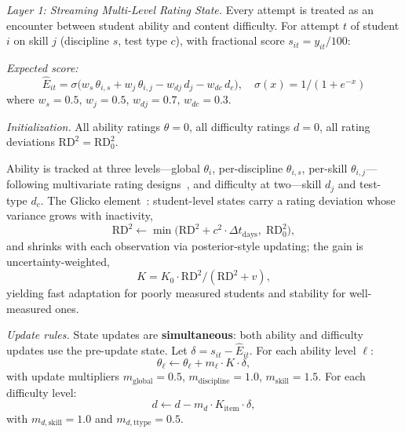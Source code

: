 \documentclass[11pt]{article}
\begin{document}
\textit{Layer 1: Streaming Multi-Level Rating State.}\quad
Every attempt is treated as an encounter between student ability and content difficulty.
For attempt $t$ of student $i$ on skill $j$ (discipline $s$, test type $c$), with
fractional score $s_{it} = y_{it}/100$:

\medskip\noindent
\textit{Expected score:}
\begin{equation}
\hat{E}_{it} = \sigma\bigl(w_s\,\theta_{i,s} + w_j\,\theta_{i,j} - w_{dj}\,d_j - w_{dc}\,d_c\bigr),
\quad \sigma(x) = 1/(1+e^{-x})
\label{eq:expected}
\end{equation}
where $w_s = 0.5$, $w_j = 0.5$, $w_{dj} = 0.7$, $w_{dc} = 0.3$.

\medskip\noindent
\textit{Initialization.}\quad
All ability ratings $\theta = 0$, all difficulty ratings $d = 0$, all rating deviations
$\mathrm{RD}^2 = \mathrm{RD}_0^2$.

\medskip\noindent
Ability is tracked at three levels---global $\theta_i$, per-discipline $\theta_{i,s}$,
per-skill $\theta_{i,j}$---following multivariate rating designs~\cite{abdi2019}, and
difficulty at two---skill $d_j$ and test-type $d_c$.
The Glicko element~\cite{glickman1999}: student-level states carry a rating deviation
whose variance grows with inactivity,
\begin{equation}
\mathrm{RD}^2 \leftarrow \min\!\bigl(\mathrm{RD}^2 + c^2 \cdot \Delta t_{\text{days}},\;\mathrm{RD}_0^2\bigr),
\end{equation}
and shrinks with each observation via posterior-style updating; the gain is
uncertainty-weighted,
\begin{equation}
K = K_0 \cdot \mathrm{RD}^2 / (\mathrm{RD}^2 + v),
\end{equation}
yielding fast adaptation for poorly measured students and stability for well-measured ones.

\medskip\noindent
\textit{Update rules.}\quad
State updates are \textbf{simultaneous}: both ability and difficulty updates use the
pre-update state.  Let $\delta = s_{it} - \hat{E}_{it}$.  For each ability level $\ell$:
\begin{equation}
\theta_\ell \leftarrow \theta_\ell + m_\ell \cdot K \cdot \delta,
\end{equation}
with update multipliers $m_{\text{global}} = 0.5$, $m_{\text{discipline}} = 1.0$,
$m_{\text{skill}} = 1.5$.
For each difficulty level:
\begin{equation}
d \leftarrow d - m_d \cdot K_{\text{item}} \cdot \delta,
\end{equation}
with $m_{d,\text{skill}} = 1.0$ and $m_{d,\text{ttype}} = 0.5$.
\end{document}
